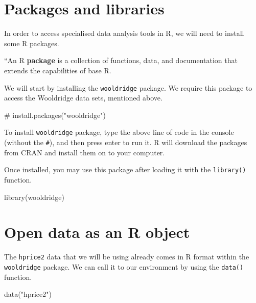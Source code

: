 \documentclass[
  letterpaper,
  DIV=11,
  numbers=noendperiod]{scrreprt}
\newenvironment{Shaded}{\begin{snugshade}}{\end{snugshade}}
\newcommand{\CommentTok}[1]{\textcolor[rgb]{0.37,0.37,0.37}{#1}}
\newcommand{\FunctionTok}[1]{\textcolor[rgb]{0.28,0.35,0.67}{#1}}
\newcommand{\NormalTok}[1]{\textcolor[rgb]{0.00,0.23,0.31}{#1}}
\newcommand{\StringTok}[1]{\textcolor[rgb]{0.13,0.47,0.30}{#1}}
\begin{document}
\section{Packages and libraries}\label{packages-and-libraries}

In order to access specialised data analysis tools in R, we will need to
install some R packages.

``An R \textbf{package} is a collection of functions, data, and
documentation that extends the capabilities of base R.

We will start by installing the \texttt{wooldridge} package. We require
this package to access the Wooldridge data sets, mentioned above.

\begin{Shaded}
\begin{Highlighting}[]
\CommentTok{\# install.packages("wooldridge")}
\end{Highlighting}
\end{Shaded}

To install \texttt{wooldridge} package, type the above line of code in
the console (without the \texttt{\#}), and then press enter to run it. R
will download the packages from CRAN and install them on to your
computer.

Once installed, you may use this package after loading it with the
\texttt{library()} function.

\begin{Shaded}
\begin{Highlighting}[]
\FunctionTok{library}\NormalTok{(wooldridge)}
\end{Highlighting}
\end{Shaded}

\section{Open data as an R object}\label{open-data-as-an-r-object}

The \texttt{hprice2} data that we will be using already comes in R
format within the \texttt{wooldridge} package. We can call it to our
environment by using the \texttt{data()} function.

\begin{Shaded}
\begin{Highlighting}[]
\FunctionTok{data}\NormalTok{(}\StringTok{"hprice2"}\NormalTok{)}
\end{Highlighting}
\end{Shaded}
\end{document}
